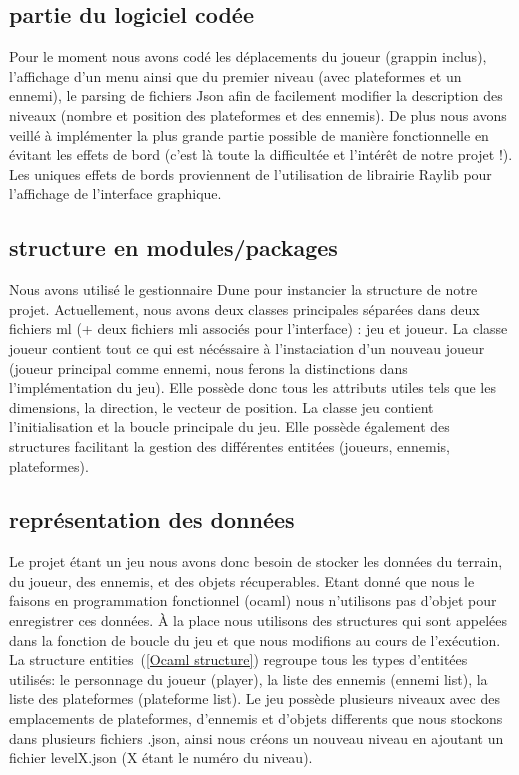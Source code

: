 \documentclass{article}
\begin{document}
\subsection{partie du logiciel codée}
Pour le moment nous avons codé les déplacements du joueur (grappin inclus), l'affichage d'un menu ainsi que du premier niveau (avec plateformes et un ennemi),
le parsing de fichiers Json afin de facilement modifier la description des niveaux (nombre et position des plateformes et des ennemis). De plus nous avons
veillé à implémenter la plus grande partie possible de manière fonctionnelle en évitant les effets de bord (c'est là toute la difficultée et l'intérêt de notre
projet !). Les uniques effets de bords proviennent de l'utilisation de librairie Raylib pour l'affichage de l'interface graphique.

\subsection{structure en modules/packages}
Nous avons utilisé le gestionnaire Dune pour instancier la structure de notre projet. Actuellement, nous avons deux classes principales
séparées dans deux fichiers ml (+ deux fichiers mli associés pour l'interface) : jeu et joueur. La classe joueur contient tout ce qui est nécéssaire à l'instaciation
d'un nouveau joueur (joueur principal comme ennemi, nous ferons la distinctions dans l'implémentation du jeu). Elle possède donc tous les attributs utiles tels
que les dimensions, la direction, le vecteur de position. La classe jeu contient l'initialisation et la boucle principale du jeu. Elle possède également
des structures facilitant la gestion des différentes entitées (joueurs, ennemis, plateformes).



\subsection{représentation des données}
Le projet étant un jeu nous avons donc besoin de stocker les données du terrain, du joueur, des ennemis, et des objets récuperables. Etant donné que nous le faisons
en  programmation fonctionnel (ocaml) nous n'utilisons pas d'objet pour enregistrer ces données. À la place nous utilisons des structures qui sont appelées dans la fonction 
de boucle du jeu et que nous modifions au cours de l'exécution. La structure entities~(\ref{Ocaml structure}) regroupe tous les types d'entitées utilisés: le personnage du joueur (player), 
la liste des ennemis (ennemi list), la liste des plateformes (plateforme list). Le jeu possède plusieurs niveaux avec des emplacements de plateformes, d'ennemis et 
d'objets differents que nous stockons dans plusieurs fichiers .json, ainsi nous créons un nouveau niveau en ajoutant un fichier levelX.json (X étant le numéro du niveau).
\end{document}

